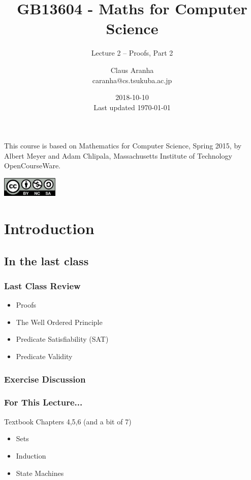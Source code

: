 \documentclass{beamer}
\title[GB13604]{GB13604 - Maths for Computer Science}
\subtitle[]{Lecture 2 -- Proofs, Part 2}
\author[Claus Aranha]{Claus Aranha\\{\footnotesize caranha@cs.tsukuba.ac.jp}}
\institute[COINS]{College of Information Science}
\date[2018-10-10]{2018-10-10\\{\tiny Last updated \today}}
\begin{document}
\begin{frame}
  \maketitle

  \begin{center}
    {\smaller This course is based on Mathematics for Computer Science, Spring
    2015, by Albert Meyer and Adam Chlipala, Massachusetts Institute
    of Technology OpenCourseWare.}
    
    \includegraphics[width=0.2\textwidth]{../img/by-nc-sa}
  \end{center}
\end{frame}

\section{Introduction}

\subsection{In the last class}
\begin{frame}
  \frametitle{Last Class Review}

  {\huge
  \begin{itemize}
  \item Proofs
  \item The Well Ordered Principle
  \item Predicate Satisfiability (SAT)
  \item Predicate Validity
  \end{itemize}
  }
\end{frame}

\begin{frame}
  \frametitle{Exercise Discussion}
\end{frame}

\begin{frame}
  \frametitle{For This Lecture...}

  {\larger
  
  Textbook Chapters 4,5,6 (and a bit of 7)
  
  \bigskip
  
  \begin{itemize}
  \item Sets
  \item \alert{Induction}
  \item State Machines
  \end{itemize}

  }
\end{frame}
\end{document}
